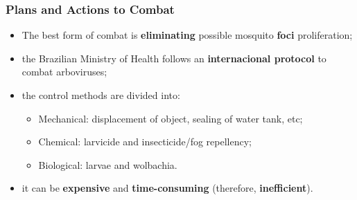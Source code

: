 \documentclass{beamer}
\begin{document}
	\begin{frame}
		\frametitle{Plans and Actions to Combat}

		\begin{itemize}
			\item The best form of combat is {\bf eliminating} possible mosquito {\bf foci} proliferation;
			\item the Brazilian Ministry of Health follows an \textbf{internacional protocol} to combat arboviruses;%
			\item the control methods are divided into:
			\begin{itemize}
				\item Mechanical: displacement of object, sealing of water tank, etc;
				\item Chemical: larvicide and insecticide/fog repellency;
				\item Biological: larvae and wolbachia.
			\end{itemize}
			\item it can be {\bf expensive} and {\bf time-consuming} (therefore, {\bf inefficient}).
		\end{itemize}
	\end{frame}
\end{document}
